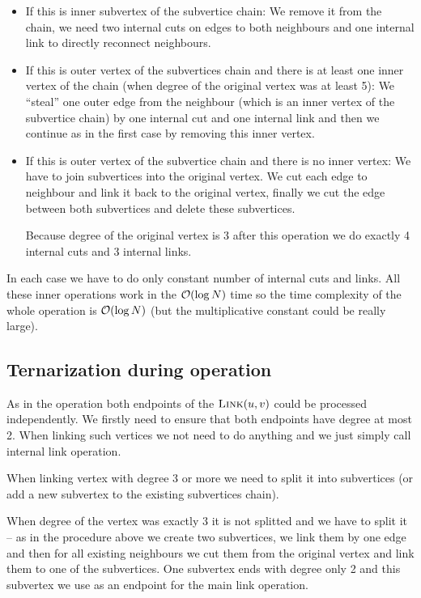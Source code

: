 \begin{itemize}
\item {\I If this is inner subvertex of the subvertice chain:} We remove it
from the chain, we need two internal cuts on edges to both neighbours and one
internal link to directly reconnect neighbours.
\item {\I If this is outer vertex of the subvertices chain and there is at least
one inner vertex of the chain (when degree of the original vertex was
at least 5):} We ``steal'' one outer edge from the neighbour (which is
an inner vertex of the subvertice chain) by one internal cut and one internal
link and then we continue as in the first case by removing this inner vertex.
\item {\I If this is outer vertex of the subvertice chain and there is no inner
vertex:} We have to join subvertices into the original vertex. We cut each edge
to neighbour and link it back to the original vertex, finally we cut the edge
between both subvertices and delete these subvertices.

Because degree of the original vertex is 3 after this operation we do exactly
4 internal cuts and 3 internal links.
\end{itemize}

In each case we have to do only constant number of internal cuts and links. All
these inner operations work in the ${\cal O}(\log N)$ time so the time complexity of
the whole \Cut{} operation is ${\cal O}(\log N)$ (but the multiplicative constant could
be really large).

\subsection{Ternarization during \Link{} operation}

As in the \Cut{} operation both endpoints of the $\hbox{\sc Link}(u,v)$ could be processed
independently. We firstly need to ensure that both endpoints have degree at
most 2. When linking such vertices we not need to do anything and we just simply
call internal link operation.

When linking vertex with degree 3 or more we need to split it into subvertices
(or add a new subvertex to the existing subvertices chain).

When degree of the vertex was exactly 3 it is not splitted and we have to split
it -- as in the procedure above we create two subvertices, we link them by one
edge and then for all existing neighbours we cut them from the original vertex
and link them to one of the subvertices. One subvertex ends with degree only
2 and this subvertex we use as an endpoint for the main link operation.

